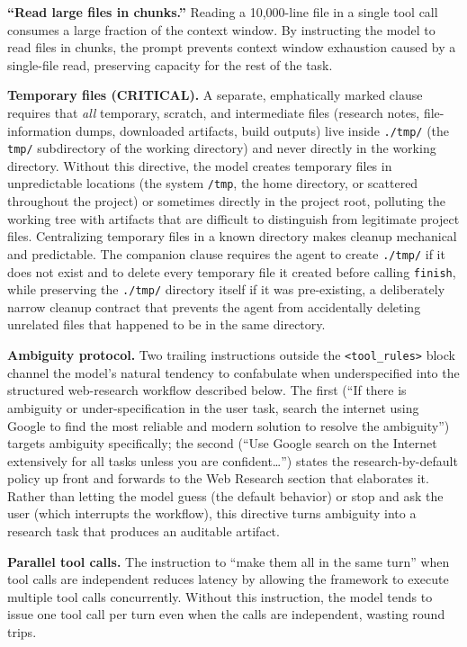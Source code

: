 \documentclass{article}
\begin{document}
\textbf{``Read large files in chunks.''}  Reading a 10,000-line file in a single tool call consumes a large fraction of the context window.  By instructing the model to read files in chunks, the prompt prevents context window exhaustion caused by a single-file read, preserving capacity for the rest of the task.

\textbf{Temporary files (CRITICAL).}  A separate, emphatically marked clause requires that \emph{all} temporary, scratch, and intermediate files (research notes, file-information dumps, downloaded artifacts, build outputs) live inside \texttt{./tmp/} (the \texttt{tmp/} subdirectory of the working directory) and never directly in the working directory.  Without this directive, the model creates temporary files in unpredictable locations (the system \texttt{/tmp}, the home directory, or scattered throughout the project) or sometimes directly in the project root, polluting the working tree with artifacts that are difficult to distinguish from legitimate project files.  Centralizing temporary files in a known directory makes cleanup mechanical and predictable.  The companion clause requires the agent to create \texttt{./tmp/} if it does not exist and to delete every temporary file it created before calling \texttt{finish}, while preserving the \texttt{./tmp/} directory itself if it was pre-existing, a deliberately narrow cleanup contract that prevents the agent from accidentally deleting unrelated files that happened to be in the same directory.

\textbf{Ambiguity protocol.}  Two trailing instructions outside the \texttt{<tool\_rules>} block channel the model's natural tendency to confabulate when underspecified into the structured web-research workflow described below.  The first (``If there is ambiguity or under-specification in the user task, search the internet using Google to find the most reliable and modern solution to resolve the ambiguity'') targets ambiguity specifically; the second (``Use Google search on the Internet extensively for all tasks unless you are confident\ldots'') states the research-by-default policy up front and forwards to the Web Research section that elaborates it.  Rather than letting the model guess (the default behavior) or stop and ask the user (which interrupts the workflow), this directive turns ambiguity into a research task that produces an auditable artifact.

\textbf{Parallel tool calls.}  The instruction to ``make them all in the same turn'' when tool calls are independent reduces latency by allowing the framework to execute multiple tool calls concurrently.  Without this instruction, the model tends to issue one tool call per turn even when the calls are independent, wasting round trips.
\end{document}
